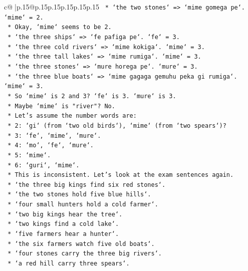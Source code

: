 \documentclass{article}
\begin{document}
{\begin{supertabular}{c@{$\;$}|p{.15\linewidth}@{}p{.15\linewidth}p{.15\linewidth}p{.15\linewidth}p{.15\linewidth}p{.15\linewidth}}
{{{\texttt{        *   `the two stones` => `mime gomega pe`. `mime` = 2.} \\
\texttt{        *   Okay, `mime` seems to be 2.} \\
\texttt{        *   `the three ships` => `fe pafiga pe`. `fe` = 3.} \\
\texttt{        *   `the three cold rivers` => `mime kokiga`. `mime` = 3.} \\
\texttt{        *   `the three tall lakes` => `mime rumiga`. `mime` = 3.} \\
\texttt{        *   `the three stones` => `mure horega pe`. `mure` = 3.} \\
\texttt{        *   `the three blue boats` => `mime gagaga gemuhu peka gi rumiga`. `mime` = 3.} \\
\texttt{        *   So `mime` is 2 and 3? `fe` is 3. `mure` is 3.} \\
\texttt{        *   Maybe `mime` is "river"? No.} \\
\texttt{        *   Let's assume the number words are:} \\
\texttt{            *   2: `gi` (from `two old birds`), `mime` (from `two spears`)?} \\
\texttt{            *   3: `fe`, `mime`, `mure`.} \\
\texttt{            *   4: `mo`, `fe`, `mure`.} \\
\texttt{            *   5: `mime`.} \\
\texttt{            *   6: `guri`, `mime`.} \\
\texttt{        *   This is inconsistent. Let's look at the exam sentences again.} \\
\texttt{        *   `the three big kings find six red stones`.} \\
\texttt{        *   `the two stones hold five blue hills`.} \\
\texttt{        *   `four small hunters hold a cold farmer`.} \\
\texttt{        *   `two big kings hear the tree`.} \\
\texttt{        *   `two kings find a cold lake`.} \\
\texttt{        *   `five farmers hear a hunter`.} \\
\texttt{        *   `the six farmers watch five old boats`.} \\
\texttt{        *   `four stones carry the three big rivers`.} \\
\texttt{        *   `a red hill carry three spears`.} \\
}}}
\end{supertabular}}
\end{document}

